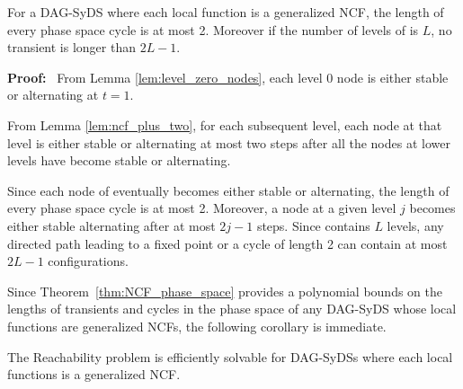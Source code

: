 \begin{theorem}\label{thm:NCF_phase_space}
For a DAG-SyDS \cals{} where each local function is a generalized NCF,
the length of every phase space cycle is at most 2.
Moreover if the number of levels of  \cals{} is $L$,
no transient is longer than $2L-1$.
\end{theorem}

\noindent
\textbf{Proof:}~ 
From Lemma \ref{lem:level_zero_nodes},
each level 0 node is either stable or alternating at $t=1$.

\medskip

From Lemma \ref{lem:ncf_plus_two},
for each subsequent level, each node at that level 
is either stable or alternating at most two steps after
all the nodes at lower levels have become stable or alternating.

\medskip

Since each node of  \cals{} eventually becomes either stable or alternating,
 the length of every phase space cycle is at most 2.
Moreover, a node at a given level $j$ becomes either stable alternating
after at most $2j-1$ steps.
Since  \cals{} contains $L$ levels,
any directed path leading to a fixed point or a cycle of length 2
can contain at most $2L-1$ configurations.
\QED

\medskip

Since Theorem~\ref{thm:NCF_phase_space} provides a polynomial bounds
on the lengths of transients and cycles in the phase space of any
DAG-SyDS whose local functions are generalized NCFs,
the following corollary is immediate.

\medskip

\begin{corollary}\label{cor:poly_ncf_dag_syds}
The Reachability problem is efficiently solvable for 
DAG-SyDSs where each local functions is a generalized NCF.
\end{corollary}
